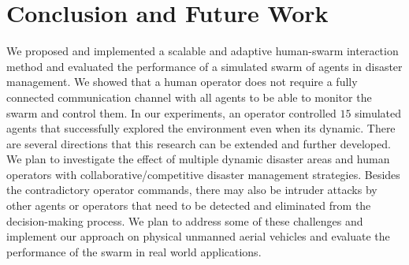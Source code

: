 \documentclass[runningheads]{llncs}%
\begin{document}
\section{Conclusion and Future Work}
\label{sec:conclusion}
We proposed and implemented a scalable and adaptive human-swarm interaction method and evaluated the performance of a simulated swarm of agents in disaster management. We showed that a human operator does not require a fully connected communication channel with all agents to be able to monitor the swarm and control them. In our experiments, an operator controlled $15$ simulated agents that successfully explored the environment even when its dynamic. There are several directions that this research can be extended and further developed. We plan to investigate the effect of multiple dynamic disaster areas and human operators with collaborative/competitive disaster management strategies. Besides the contradictory operator commands, there may also be intruder attacks by other agents or operators that need to be detected and eliminated from the decision-making process. %
We plan to address some of these challenges and implement our approach on physical unmanned aerial vehicles and evaluate the performance of the swarm in real world applications. 


%
%
%


\end{document}
